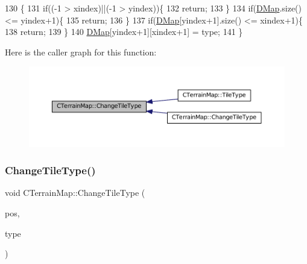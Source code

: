 \begin{DoxyCode}
130                                                                       \{
131     \textcolor{keywordflow}{if}((-1 > xindex)||(-1 > yindex))\{
132         \textcolor{keywordflow}{return};    
133     \}
134     \textcolor{keywordflow}{if}(\hyperlink{classCTerrainMap_a80d154ce478948b10473534a7bca13f6}{DMap}.size() <= yindex+1)\{
135         \textcolor{keywordflow}{return};   
136     \}
137     \textcolor{keywordflow}{if}(\hyperlink{classCTerrainMap_a80d154ce478948b10473534a7bca13f6}{DMap}[yindex+1].size() <= xindex+1)\{
138         \textcolor{keywordflow}{return};   
139     \}
140     \hyperlink{classCTerrainMap_a80d154ce478948b10473534a7bca13f6}{DMap}[yindex+1][xindex+1] = type;
141 \}
\end{DoxyCode}
Here is the caller graph for this function\+:\nopagebreak
\begin{figure}[H]
\begin{center}
\leavevmode
\includegraphics[width=350pt]{classCTerrainMap_a40757d66d7458620a327d6f69a35a2bd_icgraph}
\end{center}
\end{figure}
\hypertarget{classCTerrainMap_a4a4f26c13a3d8116f4295bef3c25c3e5}{}\label{classCTerrainMap_a4a4f26c13a3d8116f4295bef3c25c3e5} 
\subsubsection{\texorpdfstring{Change\+Tile\+Type()}{ChangeTileType()}\hspace{0.1cm}{\footnotesize\ttfamily [2/2]}}
{\footnotesize\ttfamily void C\+Terrain\+Map\+::\+Change\+Tile\+Type (\begin{DoxyParamCaption}\item[{const \hyperlink{classCPosition}{C\+Position} \&}]{pos,  }\item[{\hyperlink{classCTerrainMap_aff2ab991e237269941416dd79d8871d4}{E\+Tile\+Type}}]{type }\end{DoxyParamCaption})\hspace{0.3cm}{\ttfamily [inline]}}



